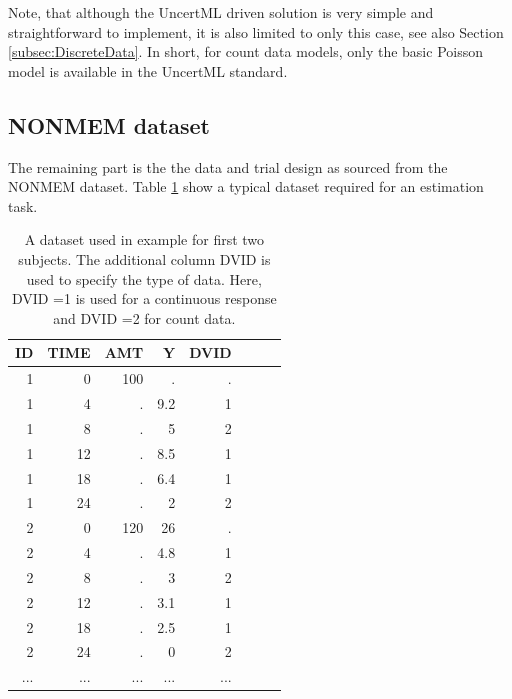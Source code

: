 Note, that although the UncertML driven solution is very simple and straightforward
to implement, it is also limited to only this case, see also Section \ref{subsec:DiscreteData}. 
In short, for count data models, only the basic Poisson model is available in the UncertML standard.


\subsection{NONMEM dataset}
\label{sec:eg6-NONMEMdataset}
The remaining part is the the data and trial design as sourced from the 
NONMEM dataset. Table \ref{tab:example6_dataSet} show a typical dataset required for 
an estimation task.
\begin{table}[htdp]
\begin{center}
\small
\begin{tabular}{rrrrrrrr}\toprule
ID 	& TIME	& AMT	& Y		& DVID \\ \midrule
1 	& 0 		& 100 	& . 		& . \\ 
1 	& 4 		& . 		& 9.2 	& 1 \\ 
1 	& 8 		& . 		& 5 		& 2 \\ 
1 	& 12 	& . 		& 8.5 	& 1 \\ 
1 	& 18 	& . 		& 6.4 	& 1 \\ 
1 	& 24 	& . 		& 2 		& 2 \\ 
2 	& 0 		& 120	&  26 	& . \\ 
2 	& 4 		& . 		& 4.8 	& 1 \\ 
2 	& 8 		& . 		& 3 		& 2 \\ 
2 	& 12 	& . 		& 3.1 	& 1 \\ 
2 	& 18 	& . 		& 2.5 	& 1 \\ 
2 	& 24 	& . 		& 0 		& 2 \\ 
...	& ...		& ...		& ...		& ...	\\ \bottomrule
\end{tabular}
\end{center}
\caption{A dataset used in example for first two subjects.
The additional column DVID is used to specify the type of data. Here, 
DVID =1 is used for a continuous response and DVID =2 for count data.}
\label{tab:example6_dataSet}
\end{table}%

